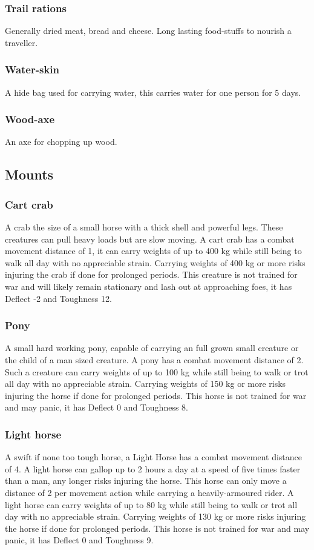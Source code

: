 \documentclass[a4paper,11pt,oneside]{book}
\begin{document}
\subsubsection{Trail rations}
Generally dried meat, bread and cheese. Long lasting food-stuffs to nourish a traveller.

\subsubsection{Water-skin}
A hide bag used for carrying water, this carries water for one person for 5 days.

\subsubsection{Wood-axe}
An axe for chopping up wood.

\subsection{Mounts}

\subsubsection{Cart crab}
A crab the size of a small horse with a thick shell and powerful legs. These creatures can pull heavy loads but are slow moving. A cart crab has a combat movement distance of 1, it can carry weights of up to 400 kg while still being to walk all day with no appreciable strain. Carrying weights of 400 kg or more risks injuring the crab if done for prolonged periods. This creature is not trained for war and will likely remain stationary and lash out at approaching foes, it has Deflect -2 and Toughness 12.

\subsubsection{Pony}
A small hard working pony, capable of carrying an full grown small creature or the child of a man sized creature. A pony has a combat movement distance of 2. Such a creature can carry weights of up to 100 kg while still being to walk or trot all day with no appreciable strain. Carrying weights of 150 kg or more risks injuring the horse if done for prolonged periods. This horse is not trained for war and may panic, it has Deflect 0 and Toughness 8.

\subsubsection{Light horse}
A swift if none too tough horse, a Light Horse has a combat movement distance of 4. A light horse can gallop up to 2 hours a day at a speed of five times faster than a man, any longer risks injuring the horse. This horse can only move a distance of 2 per movement action while carrying a heavily-armoured rider. A light horse can carry weights of up to 80 kg while still being to walk or trot all day with no appreciable strain. Carrying weights of 130 kg or more risks injuring the horse if done for prolonged periods. This horse is not trained for war and may panic, it has Deflect 0 and Toughness 9.
\end{document}
